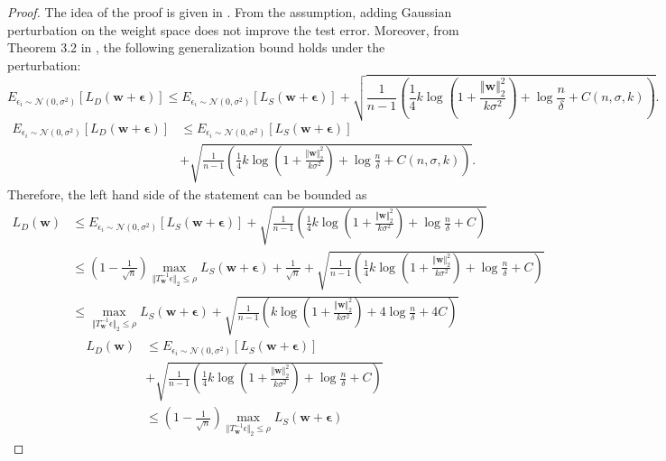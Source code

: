 \documentclass{article}
\newcommand{\mf}[1]{\mathbf{#1}}
\begin{document}
\begin{proof}
The idea of the proof is given in \citet{foret2021sharpnessaware}. From the assumption, adding Gaussian perturbation on the weight space does not improve the test error.
Moreover, from Theorem 3.2 in \citet{chatterji2019intriguing}, the following generalization bound holds under the perturbation:
\ificml
    \[ E_{\epsilon_i \sim \mathcal{N}(0, \sigma^2)} [L_D(\mf w+\bm\epsilon)]
    \leq E_{\epsilon_i \sim \mathcal{N}(0, \sigma^2)} [L_S(\mf w+\bm\epsilon)]
    + \sqrt{\frac{1}{n-1}\left(\frac{1}{4}k\log\left(1 + \frac{\Vert\mf{w}\Vert_2^2}{k\sigma^2}\right) + \log\frac{n}{\delta} + C(n, \sigma, k)\right)}.\]
\else
    \begin{align}
        \nonumber E_{\epsilon_i \sim \mathcal{N}(0, \sigma^2)} [L_D(\mf w+\bm\epsilon)] &
        \leq E_{\epsilon_i \sim \mathcal{N}(0, \sigma^2)} [L_S(\mf w+\bm\epsilon)] \\
        \nonumber &+ \sqrt{\frac{1}{n-1}\left(\frac{1}{4}k\log\left(1 + \frac{\Vert\mf{w}\Vert_2^2}{k\sigma^2}\right) + \log\frac{n}{\delta} + C(n, \sigma, k)\right)}.
    \end{align}
\fi
Therefore, the left hand side of the statement can be bounded as
\ificml
    \begin{align*}
        L_D(\mf w) &\leq E_{\epsilon_i \sim \mathcal{N}(0, \sigma^2)} [L_S(\mf w+\bm\epsilon)] + \sqrt{\frac{1}{n-1}\left(\frac{1}{4}k\log\left(1 + \frac{\Vert\mf{w}\Vert_2^2}{k\sigma^2}\right) + \log\frac{n}{\delta} + C\right)}\\
        &\leq \left(1-\frac{1}{\sqrt{n}}\right) \max_{\Vert T^{-1}_\mf{w} \epsilon\Vert_2 \leq \rho} L_S(\mf w+\bm\epsilon)
        + \frac{1}{\sqrt{n}} + \sqrt{\frac{1}{n-1}\left(\frac{1}{4}k\log\left(1 + \frac{\Vert\mf{w}\Vert_2^2}{k\sigma^2}\right) + \log\frac{n}{\delta} + C\right)}\\
        &\leq \max_{\Vert T^{-1}_\mf{w} \epsilon\Vert_2 \leq \rho} L_S(\mf w+\bm\epsilon)
        + \sqrt{\frac{1}{n-1}\left(k\log\left(1 + \frac{\Vert\mf{w}\Vert_2^2}{k\sigma^2}\right) + 4\log\frac{n}{\delta} + 4C\right)}
    \end{align*}
\else
    \begin{align*}
        L_D(\mf w) &\leq E_{\epsilon_i \sim \mathcal{N}(0, \sigma^2)} [L_S(\mf w+\bm\epsilon)] \\
        &+ \sqrt{\frac{1}{n-1}\left(\frac{1}{4}k\log\left(1 + \frac{\Vert\mf{w}\Vert_2^2}{k\sigma^2}\right) + \log\frac{n}{\delta} + C\right)}\\
        &\leq \left(1-\frac{1}{\sqrt{n}}\right) \max_{\Vert T^{-1}_\mf{w} \epsilon\Vert_2 \leq \rho} L_S(\mf w+\bm\epsilon) 

\end{align*}
\end{proof}
\end{document}
